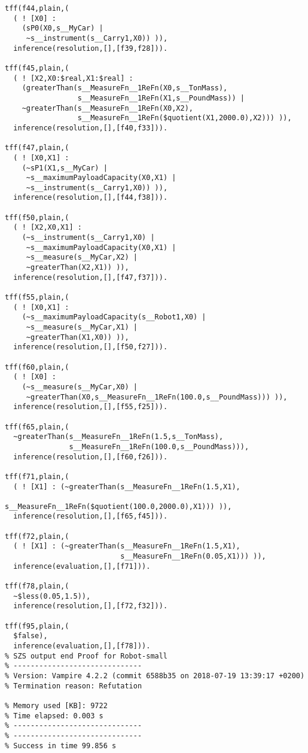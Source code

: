 \documentclass{article}
\begin{document}
\begin{verbatim}
tff(f44,plain,(
  ( ! [X0] : 
    (sP0(X0,s__MyCar) | 
     ~s__instrument(s__Carry1,X0)) )),
  inference(resolution,[],[f39,f28])).

tff(f45,plain,(
  ( ! [X2,X0:$real,X1:$real] : 
    (greaterThan(s__MeasureFn__1ReFn(X0,s__TonMass),
                 s__MeasureFn__1ReFn(X1,s__PoundMass)) |   
    ~greaterThan(s__MeasureFn__1ReFn(X0,X2),
                 s__MeasureFn__1ReFn($quotient(X1,2000.0),X2))) )),
  inference(resolution,[],[f40,f33])).

tff(f47,plain,(
  ( ! [X0,X1] : 
    (~sP1(X1,s__MyCar) | 
     ~s__maximumPayloadCapacity(X0,X1) | 
     ~s__instrument(s__Carry1,X0)) )),
  inference(resolution,[],[f44,f38])).

tff(f50,plain,(
  ( ! [X2,X0,X1] : 
    (~s__instrument(s__Carry1,X0) | 
     ~s__maximumPayloadCapacity(X0,X1) | 
     ~s__measure(s__MyCar,X2) | 
     ~greaterThan(X2,X1)) )),
  inference(resolution,[],[f47,f37])).

tff(f55,plain,(
  ( ! [X0,X1] : 
    (~s__maximumPayloadCapacity(s__Robot1,X0) | 
     ~s__measure(s__MyCar,X1) | 
     ~greaterThan(X1,X0)) )),
  inference(resolution,[],[f50,f27])).

tff(f60,plain,(
  ( ! [X0] : 
    (~s__measure(s__MyCar,X0) | 
     ~greaterThan(X0,s__MeasureFn__1ReFn(100.0,s__PoundMass))) )),
  inference(resolution,[],[f55,f25])).

tff(f65,plain,(
  ~greaterThan(s__MeasureFn__1ReFn(1.5,s__TonMass),
               s__MeasureFn__1ReFn(100.0,s__PoundMass))),
  inference(resolution,[],[f60,f26])).

tff(f71,plain,(
  ( ! [X1] : (~greaterThan(s__MeasureFn__1ReFn(1.5,X1),
                           s__MeasureFn__1ReFn($quotient(100.0,2000.0),X1))) )),
  inference(resolution,[],[f65,f45])).

tff(f72,plain,(
  ( ! [X1] : (~greaterThan(s__MeasureFn__1ReFn(1.5,X1),
                           s__MeasureFn__1ReFn(0.05,X1))) )),
  inference(evaluation,[],[f71])).

tff(f78,plain,(
  ~$less(0.05,1.5)),
  inference(resolution,[],[f72,f32])).

tff(f95,plain,(
  $false),
  inference(evaluation,[],[f78])).
% SZS output end Proof for Robot-small
% ------------------------------
% Version: Vampire 4.2.2 (commit 6588b35 on 2018-07-19 13:39:17 +0200)
% Termination reason: Refutation

% Memory used [KB]: 9722
% Time elapsed: 0.003 s
% ------------------------------
% ------------------------------
% Success in time 99.856 s

\end{verbatim}

\newpage
\clearpage



 
\end{document}
